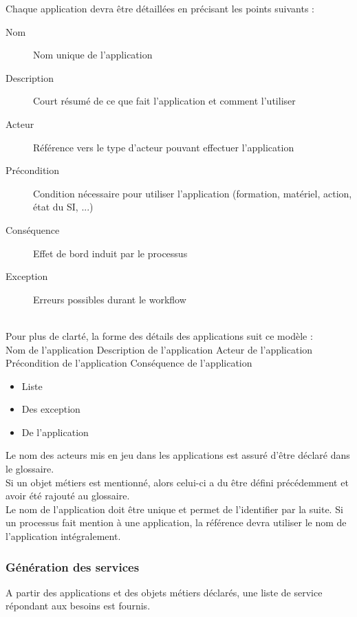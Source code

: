 Chaque application devra être détaillées en précisant les points suivants :
\begin{description}
  \item[Nom] Nom unique de l'application
  \item[Description] Court résumé de ce que fait l'application et comment
    l'utiliser
  \item[Acteur] Référence vers le type d'acteur pouvant effectuer l'application
  \item[Précondition] Condition nécessaire pour utiliser l'application
    (formation, matériel, action, état du SI, ...)
  \item[Conséquence] Effet de bord induit par le processus
  \item[Exception] Erreurs possibles durant le workflow %
\end{description}

~\\
Pour plus de clarté, la forme des détails des applications suit ce modèle : \\

\CUBref
{Nom de l'application}
{Description de l'application}
{Acteur de l'application}
{Précondition de l'application}
{Conséquence de l'application}
{
  \begin{itemize}
    \item Liste
    \item Des exception
    \item De l'application
  \end{itemize}
}

Le nom des acteurs mis en jeu dans les applications est assuré d'être déclaré
dans le glossaire. \\

Si un objet métiers est mentionné, alors celui-ci a du être défini précédemment
et avoir été rajouté au glossaire. \\

Le nom de l'application doit être unique et permet de l'identifier par la
suite. Si un processus fait mention à une application, la référence devra
utiliser le nom de l'application intégralement. \\

\subsubsection{Génération des services}
A partir des applications et des objets métiers déclarés, une liste de service
répondant aux besoins est fournis. \\

